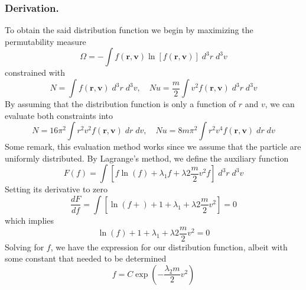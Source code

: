 \documentclass[../../../Main.tex]{subfiles}
\begin{document}
\subsubsection*{Derivation.} To obtain the said distribution function we begin by maximizing the permutability measure
\begin{equation*}
    \Omega=-\int f(\mathbf{r},\mathbf{v})\ln [f(\mathbf{r},\mathbf{v})]\;d^3r\;d^3v
\end{equation*}
constrained with 
\begin{equation*}
    N=\int f(\mathbf{r},\mathbf{v})\;d^3r\;d^3v,\quad Nu=\frac{m}{2}\int  v^2f(\mathbf{r},\mathbf{v})\;d^3r\;d^3v
\end{equation*}
By assuming that the distribution function is only a function of $r$ and $v$, we can evaluate both constraints into
\begin{equation*}
    N=16\pi^2\int r^2v^2 f(\mathbf{r},\mathbf{v})\;dr\;dv,\quad Nu=8m\pi^2\int r^2v^4f(\mathbf{r},\mathbf{v})\;dr\;dv
\end{equation*}
Some remark, this evaluation method works since we assume that the particle are uniformly distributed. By Lagrange's method, we define the auxiliary function
\begin{equation*}
    F(f)=\int \left[f\ln (f)+ \lambda_1f+\lambda2\frac{m}{2}v^2f\right] \;d^3r\;d^3v
\end{equation*}
Setting its derivative to zero 
\begin{equation*}
    \frac{dF}{df} = \int \left[\ln(f+) +1 + \lambda_1 +\lambda2\frac{m}{2}v^2\right] =0
\end{equation*}
which implies
\begin{equation*}
    \ln(f) +1 + \lambda_1 +\lambda2\frac{m}{2}v^2=0
\end{equation*}
Solving for $f$, we have the expression for our distribution function, albeit with some constant that needed to be determined
\begin{equation*}
    f=C\exp\left(- \frac{\lambda_2m}{2}v^2\right)
\end{equation*}
\end{document}
